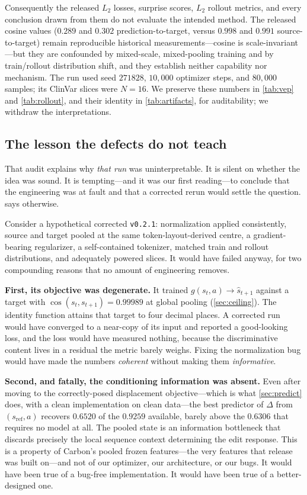 \documentclass{article}
\newcommand{\sref}{s_{\mathrm{ref}}}
\newcommand{\D}{\Delta}
\newcommand{\gpred}{g}
\begin{document}
Consequently the released $L_2$ losses, surprise scores, $L_2$ rollout metrics, and every conclusion
drawn from them do not evaluate the intended method. The released cosine values ($0.289$ and $0.302$
prediction-to-target, versus $0.998$ and $0.991$ source-to-target) remain reproducible historical
measurements---cosine is scale-invariant---but they are confounded by mixed-scale, mixed-pooling
training and by train/rollout distribution shift, and they establish neither capability nor
mechanism. The run used seed $271828$, $10{,}000$ optimizer steps, and $80{,}000$ samples; its
ClinVar slices were $N{=}16$. We preserve these numbers in \cref{tab:vep} and \cref{tab:rollout},
and their identity in \cref{tab:artifacts}, for auditability; we withdraw the interpretations.

\subsection{The lesson the defects do not teach}

That audit explains why \emph{that run} was uninterpretable. It is silent on whether the idea was
sound. It is tempting---and it was our first reading---to conclude that the engineering was at fault
and that a corrected rerun would settle the question.  says otherwise.

Consider a hypothetical corrected \texttt{v0.2.1}: normalization applied consistently, source and
target pooled at the same token-layout-derived centre, a gradient-bearing regularizer, a
self-contained tokenizer, matched train and rollout distributions, and adequately powered slices. It
would have failed anyway, for two compounding reasons that no amount of engineering removes.

\textbf{First, its objective was degenerate.} It trained $\gpred(s_t,a)\to\hat s_{t+1}$ against a
target with $\cos(s_t,s_{t+1})=0.99989$ at global pooling (\cref{sec:ceiling}). The identity
function attains that target to four decimal places. A corrected run would have converged to a
near-copy of its input and reported a good-looking loss, and the loss would have measured nothing,
because the discriminative content lives in a residual the metric barely weighs. Fixing the
normalization bug would have made the numbers \emph{coherent} without making them
\emph{informative}.

\textbf{Second, and fatally, the conditioning information was absent.} Even after moving to the
correctly-posed displacement objective---which is what \cref{sec:predict} does, with a clean
implementation on clean data---the best predictor of $\D$ from $(\sref,a)$ recovers $0.6520$ of the
$0.9259$ available, barely above the $0.6306$ that requires no model at all. The pooled state is an
information bottleneck that discards precisely the local sequence context determining the edit
response. This is a property of Carbon's pooled frozen features---the very features that release was
built on---and not of our optimizer, our architecture, or our bugs. It would have been true of a
bug-free implementation. It would have been true of a better-designed one.
\end{document}
